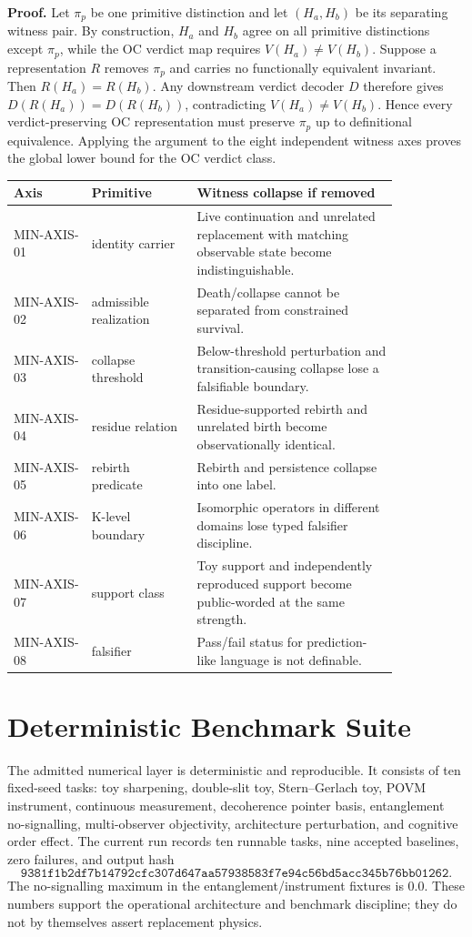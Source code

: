 \documentclass[11pt,a4paper]{article}
\begin{document}
\textbf{Proof.} Let $\pi_p$ be one primitive distinction and let $(H_a,H_b)$ be its separating witness pair. By construction, $H_a$ and $H_b$ agree on all primitive distinctions except $\pi_p$, while the OC verdict map requires $V(H_a)\neq V(H_b)$. Suppose a representation $R$ removes $\pi_p$ and carries no functionally equivalent invariant. Then $R(H_a)=R(H_b)$. Any downstream verdict decoder $D$ therefore gives $D(R(H_a))=D(R(H_b))$, contradicting $V(H_a)\neq V(H_b)$. Hence every verdict-preserving OC representation must preserve $\pi_p$ up to definitional equivalence. Applying the argument to the eight independent witness axes proves the global lower bound for the OC verdict class.

\begin{longtable}{>{\raggedright\arraybackslash}p{0.17\linewidth}>{\raggedright\arraybackslash}p{0.23\linewidth}>{\raggedright\arraybackslash}p{0.44\linewidth}}
\textbf{Axis} & \textbf{Primitive} & \textbf{Witness collapse if removed}\\
\hline
MIN-AXIS-01 & identity carrier & Live continuation and unrelated replacement with matching observable state become indistinguishable.\\
MIN-AXIS-02 & admissible realization & Death/collapse cannot be separated from constrained survival.\\
MIN-AXIS-03 & collapse threshold & Below-threshold perturbation and transition-causing collapse lose a falsifiable boundary.\\
MIN-AXIS-04 & residue relation & Residue-supported rebirth and unrelated birth become observationally identical.\\
MIN-AXIS-05 & rebirth predicate & Rebirth and persistence collapse into one label.\\
MIN-AXIS-06 & K-level boundary & Isomorphic operators in different domains lose typed falsifier discipline.\\
MIN-AXIS-07 & support class & Toy support and independently reproduced support become public-worded at the same strength.\\
MIN-AXIS-08 & falsifier & Pass/fail status for prediction-like language is not definable.\\
\end{longtable}

\section*{Deterministic Benchmark Suite}
The admitted numerical layer is deterministic and reproducible. It consists of ten fixed-seed tasks: toy sharpening, double-slit toy, Stern--Gerlach toy, POVM instrument, continuous measurement, decoherence pointer basis, entanglement no-signalling, multi-observer objectivity, architecture perturbation, and cognitive order effect. The current run records ten runnable tasks, nine accepted baselines, zero failures, and output hash
\[
  \texttt{9381f1b2df7b14792cfc307d647aa57938583f7e94c56bd5acc345b76bb01262}.
\]
The no-signalling maximum in the entanglement/instrument fixtures is $0.0$. These numbers support the operational architecture and benchmark discipline; they do not by themselves assert replacement physics.
\end{document}

